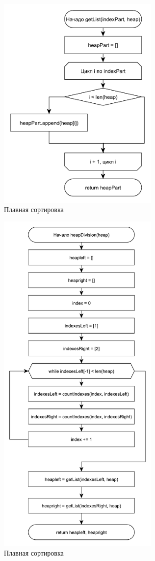 \documentclass[12pt,a4paper]{scrartcl}
\begin{document}
		\begin{figure}[H]
			\centering
			\includegraphics[width=300px]{34.pdf}
			\caption{Плавная сортировка}
			\label{graph2.8}
		\end{figure}
		
		\begin{figure}[H]
			\centering
			\includegraphics[width=300px]{35.pdf}
			\caption{Плавная сортировка}
			\label{graph2.9}
		\end{figure}
	
\end{document}
